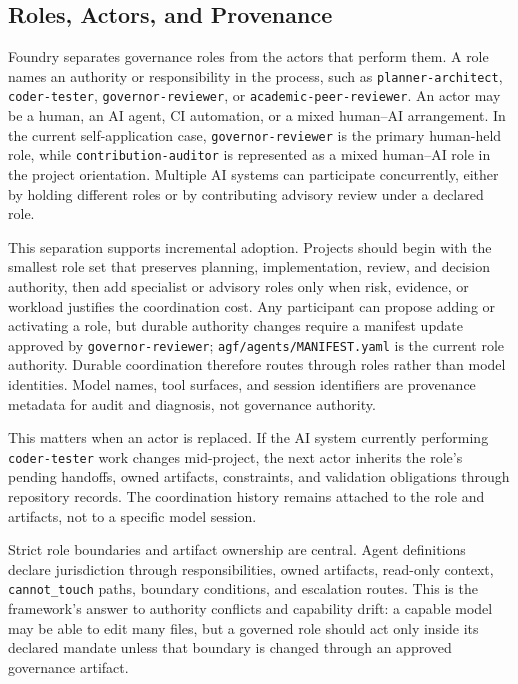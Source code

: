 \documentclass[conference]{IEEEtran}
\begin{document}
\subsection{Roles, Actors, and Provenance}

Foundry separates governance roles from the actors that perform them. A role names an authority or responsibility in the process, such as \texttt{planner-architect}, \texttt{coder-tester}, \texttt{governor-reviewer}, or \texttt{academic-peer-reviewer}. An actor may be a human, an AI agent, CI automation, or a mixed human--AI arrangement. In the current self-application case, \texttt{governor-reviewer} is the primary human-held role, while \texttt{contribution-auditor} is represented as a mixed human--AI role in the project orientation. Multiple AI systems can participate concurrently, either by holding different roles or by contributing advisory review under a declared role.

This separation supports incremental adoption. Projects should begin with the smallest role set that preserves planning, implementation, review, and decision authority, then add specialist or advisory roles only when risk, evidence, or workload justifies the coordination cost. Any participant can propose adding or activating a role, but durable authority changes require a manifest update approved by \texttt{governor-reviewer}; \texttt{agf/agents/MANIFEST.yaml} is the current role authority. Durable coordination therefore routes through roles rather than model identities. Model names, tool surfaces, and session identifiers are provenance metadata for audit and diagnosis, not governance authority.

This matters when an actor is replaced. If the AI system currently performing \texttt{coder-tester} work changes mid-project, the next actor inherits the role's pending handoffs, owned artifacts, constraints, and validation obligations through repository records. The coordination history remains attached to the role and artifacts, not to a specific model session.

Strict role boundaries and artifact ownership are central. Agent definitions declare jurisdiction through responsibilities, owned artifacts, read-only context, \texttt{cannot\_touch} paths, boundary conditions, and escalation routes. This is the framework's answer to authority conflicts and capability drift: a capable model may be able to edit many files, but a governed role should act only inside its declared mandate unless that boundary is changed through an approved governance artifact.
\end{document}
